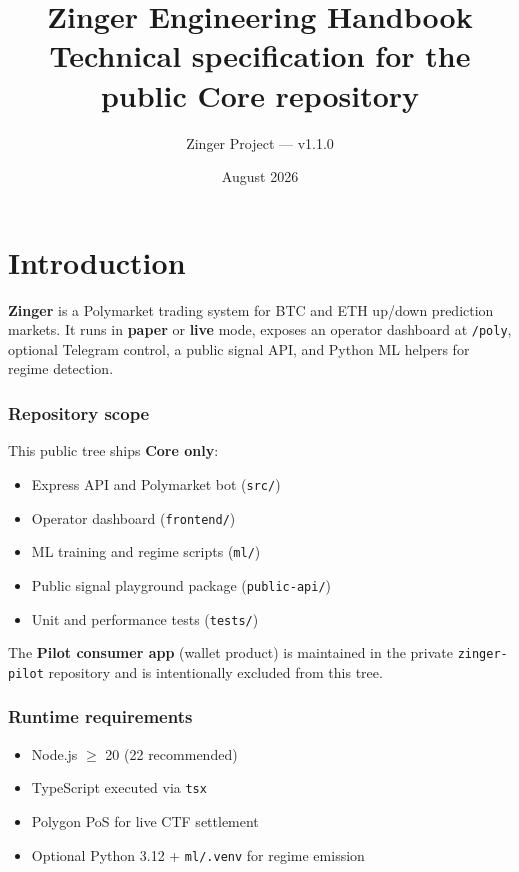 \documentclass[11pt,a4paper]{report}
\title{\textbf{Zinger Engineering Handbook}\\\large Technical specification for the public Core repository}
\author{Zinger Project --- v1.1.0}
\date{August 2026}
\begin{document}
\maketitle
\tableofcontents
\clearpage

\chapter{Introduction}

\textbf{Zinger} is a Polymarket trading system for BTC and ETH up/down prediction markets.
It runs in \textbf{paper} or \textbf{live} mode, exposes an operator dashboard at \texttt{/poly},
optional Telegram control, a public signal API, and Python ML helpers for regime detection.

\subsection{Repository scope}

This public tree ships \textbf{Core only}:
\begin{itemize}[noitemsep]
  \item Express API and Polymarket bot (\texttt{src/})
  \item Operator dashboard (\texttt{frontend/})
  \item ML training and regime scripts (\texttt{ml/})
  \item Public signal playground package (\texttt{public-api/})
  \item Unit and performance tests (\texttt{tests/})
\end{itemize}

The \textbf{Pilot consumer app} (wallet product) is maintained in the private
\texttt{zinger-pilot} repository and is intentionally excluded from this tree.

\subsection{Runtime requirements}

\begin{itemize}[noitemsep]
  \item Node.js $\geq$ 20 (22 recommended)
  \item TypeScript executed via \texttt{tsx}
  \item Polygon PoS for live CTF settlement
  \item Optional Python 3.12 + \texttt{ml/.venv} for regime emission
\end{itemize}
\end{document}
